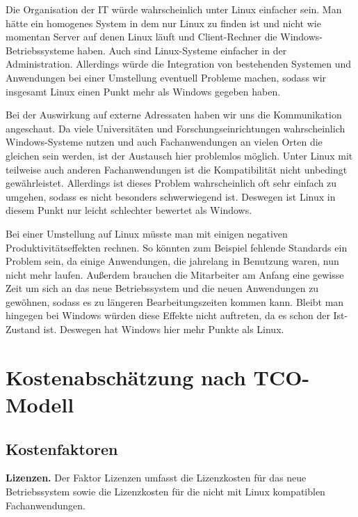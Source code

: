 \documentclass[12pt,utf8]{scrartcl}
\begin{document}
Die Organisation der IT würde wahrscheinlich unter Linux einfacher sein. Man hätte ein homogenes System in dem nur Linux zu finden ist und nicht wie momentan Server auf denen Linux läuft und Client-Rechner die Windows-Betriebssysteme haben. Auch sind Linux-Systeme einfacher in der Administration. Allerdings würde die Integration von bestehenden Systemen und Anwendungen bei einer Umstellung eventuell Probleme machen, sodass wir insgesamt Linux einen Punkt mehr als Windows gegeben haben.

Bei der Auswirkung auf externe Adressaten haben wir uns die Kommunikation angeschaut. Da viele Universitäten und Forschungseinrichtungen wahrscheinlich Windows-Systeme nutzen und auch Fachanwendungen an vielen Orten die gleichen sein werden, ist der Austausch hier problemlos möglich. Unter Linux mit teilweise auch anderen Fachanwendungen ist die Kompatibilität nicht unbedingt gewährleistet. Allerdings ist dieses Problem wahrscheinlich oft sehr einfach zu umgehen, sodass es nicht besonders schwerwiegend ist. Deswegen ist Linux in diesem Punkt nur leicht schlechter bewertet als Windows.

Bei einer Umstellung auf Linux müsste man mit einigen negativen Produktivitätseffekten rechnen. So könnten zum Beispiel fehlende Standards ein Problem sein, da einige Anwendungen, die jahrelang in Benutzung waren, nun nicht mehr laufen. Außerdem brauchen die Mitarbeiter am Anfang eine gewisse Zeit um sich an das neue Betriebssystem und die neuen Anwendungen zu gewöhnen, sodass es zu längeren Bearbeitungszeiten kommen kann. Bleibt man hingegen bei Windows würden diese Effekte nicht auftreten, da es schon der Ist-Zustand ist. Deswegen hat Windows hier mehr Punkte als Linux. 

\newpage
\section*{Kostenabschätzung nach TCO-Modell}

\subsection*{Kostenfaktoren}

\textbf{Lizenzen.} Der Faktor Lizenzen umfasst die Lizenzkosten für das neue Betriebssystem sowie die Lizenzkosten für die nicht mit Linux kompatiblen Fachanwendungen.
\newline
\end{document}
